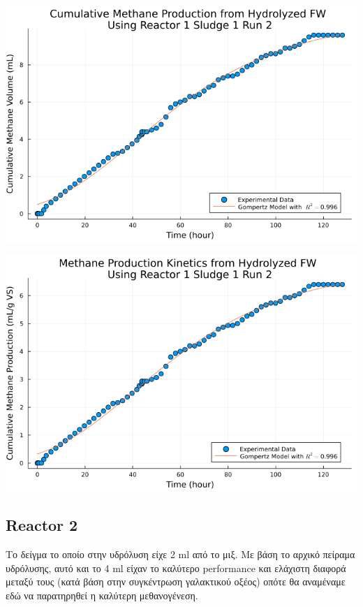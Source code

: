 \documentclass[11pt]{article}
\begin{document}
\begin{center}
\includegraphics[width=.9\linewidth]{../plots/BMPs/Hydrolyzed FW/methane_kinetics_hydrolysate_1_s1_r2_hour.png}
\end{center}

\begin{center}
\includegraphics[width=.9\linewidth]{../plots/BMPs/Hydrolyzed FW/specific_methane_kinetics_hydrolysate_1_s1_r2_hour.png}
\end{center}

\subsection{Reactor 2}
\label{sec:orgb33c9e7}
Το δείγμα το οποίο στην υδρόλυση είχε 2 ml από το μιξ. Με βάση το αρχικό πείραμα υδρόλυσης, αυτό και το 4 ml είχαν το καλύτερο performance και ελάχιστη διαφορά μεταξύ τους (κατά βάση στην συγκέντρωση γαλακτικού οξέος) οπότε θα αναμέναμε εδώ να παρατηρηθεί η καλύτερη μεθανογένεση.
\end{document}
